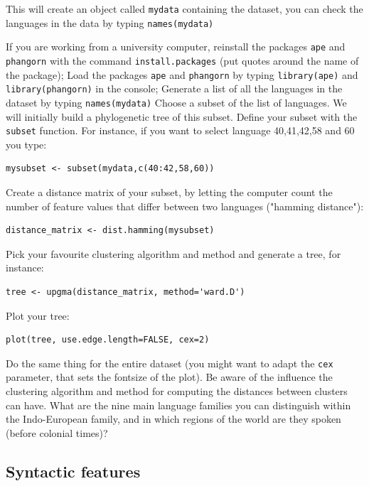\documentclass[a4paper, 9pt]{article}
\begin{document}
This will create an object called \verb|mydata| containing the dataset,
you can check the languages in the data by typing \verb|names(mydata)|

\begin{exercise}
\action If you are working from a university computer, reinstall the packages \verb|ape| and \verb|phangorn| with the command \verb|install.packages| (put quotes around the name of the package);
\action Load the packages \verb|ape| and \verb|phangorn| by typing \verb|library(ape)| and \verb|library(phangorn)| in the console;
\action Generate a list of all the languages in the dataset by typing \verb|names(mydata)|
\action Choose a subset of the list of languages. We will initially build a phylogenetic tree of this subset.
\action Define your subset with the \verb|subset| function. For instance, if you want to select language 40,41,42,58 and 60 you type:
\begin{lstlisting}
mysubset <- subset(mydata,c(40:42,58,60))
\end{lstlisting}
\action Create a distance matrix of your subset, by letting the computer count the number of feature values that differ between two languages ("hamming distance"):\begin{lstlisting}
distance_matrix <- dist.hamming(mysubset)
\end{lstlisting}
\action Pick your favourite clustering algorithm and method and generate a tree, for instance:\begin{lstlisting}
tree <- upgma(distance_matrix, method='ward.D')
\end{lstlisting}
\action Plot your tree:\begin{lstlisting}
plot(tree, use.edge.length=FALSE, cex=2)
\end{lstlisting}
\action Do the same thing for the entire dataset (you might want to adapt the \verb|cex| parameter, that sets the fontsize of the plot). Be aware of the influence the clustering algorithm and method for computing the distances between clusters can have.
\askstar What are the nine main language families you can distinguish within the Indo-European family, and in which regions of the world are they spoken (before colonial times)?
\end{exercise}

\subsection{Syntactic features}\label{syntactic-features}
\end{document}
